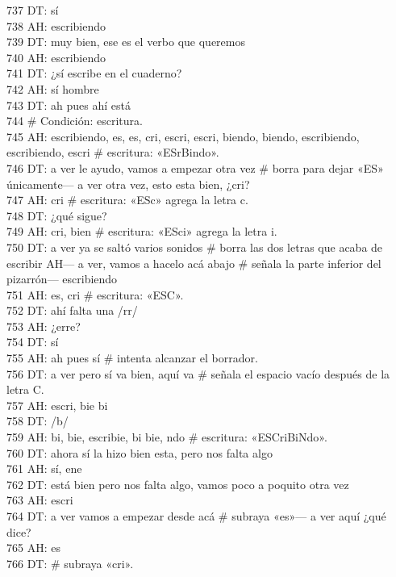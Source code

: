 737 DT: sí\\
738 AH: escribiendo\\
739 DT: muy bien, ese es el verbo que queremos\\
740 AH: escribiendo\\
741 DT: ¿sí escribe en el cuaderno?\\
742 AH: sí hombre\\
743 DT: ah pues ahí está\\
744 \# Condición: escritura.\\
745 AH: escribiendo, es, es, cri, escri, escri, biendo, biendo, escribiendo, escribiendo, escri \# escritura: «ESrBindo».\\
746 DT: a ver le ayudo, vamos a empezar otra vez \# borra para dejar «ES» únicamente--- a ver otra vez, esto esta bien, ¿cri?\\
747 AH: cri \# escritura: «ESc» agrega la letra c.\\
748 DT: ¿qué sigue?\\
749 AH: cri, bien \# escritura: «ESci» agrega la letra i.\\
750 DT: a ver ya se saltó varios sonidos \# borra las dos letras que acaba de escribir AH--- a ver, vamos a hacelo acá abajo \# señala la parte inferior del pizarrón--- escribiendo\\
751 AH: es, cri \# escritura: «ESC».\\
752 DT: ahí falta una /rr/\\
753 AH: ¿erre?\\
754 DT: sí\\
755 AH: ah pues sí \# intenta alcanzar el borrador.\\
756 DT: a ver pero sí va bien, aquí va \# señala el espacio vacío después de la letra C.\\
757 AH: escri, bie bi\\
758 DT: /b/\\
759 AH: bi, bie, escribie, bi bie, ndo \# escritura: «ESCriBiNdo».\\
760 DT: ahora sí la hizo bien esta, pero nos falta algo\\
761 AH: sí, ene\\
762 DT: está bien pero nos falta algo, vamos poco a poquito otra vez\\
763 AH: escri\\
764 DT: a ver vamos a empezar desde acá \# subraya «es»--- a ver aquí ¿qué dice?\\
765 AH: es\\
766 DT: \# subraya «cri».\\
